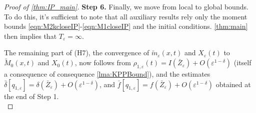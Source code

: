 \documentclass[]{article}
\theoremstyle{remark}
\begin{document}
\begin{proof}[{Proof of \cref{thm:IP_main}}]
\textbf{Step 6.} Finally, we  move from local to global bounds. To do this, it's sufficient to note that all auxiliary results rely only the moment bounds \eqref{eqn:M2kcloseIP}-\eqref{eqn:M1closeIP} and the initial conditions. \cref{thm:main} then implies that $T_\varepsilon=\infty$. 

The remaining part of (H7), the convergence of $\tilde{m}_\varepsilon(x,t)$ and $X_\varepsilon(t)$ to $\widetilde{M}_0(x,t)$ and $X_0(t)$, now follows from $\rho_{1,\varepsilon}(t)=I(\bar{Z}_\varepsilon)+O(\varepsilon^{1-\delta})$ (itself a consequence of consequence \cref{lma:KPPBound}), and the estimates $\bar{\delta}[q_{1,\varepsilon}]=\delta(\bar{Z}_{\varepsilon})+O(\varepsilon^{1-\delta})$, and $\bar{f}[q_{1,\varepsilon}]=f(\bar{Z}_{\varepsilon})+O(\varepsilon^{1-\delta})$ obtained at the end of Step 1.
\vspace{-\belowdisplayskip}\[\]

\end{proof}
\end{document}
